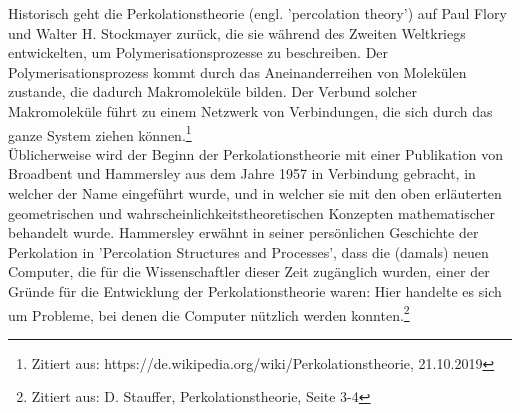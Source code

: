 \documentclass[a4paper, 12pt]{scrartcl}
\begin{document}
\noindent Historisch geht die Perkolationstheorie (engl. 'percolation theory') auf Paul Flory und Walter H. Stockmayer zurück, die sie während des Zweiten Weltkriegs entwickelten, um Polymerisationsprozesse zu beschreiben. Der Polymerisationsprozess kommt durch das Aneinanderreihen von Molekülen zustande, die dadurch Makromoleküle bilden. Der Verbund solcher Makromoleküle führt zu einem Netzwerk von Verbindungen, die sich durch das ganze System ziehen können.\footnote{Zitiert aus: https://de.wikipedia.org/wiki/Perkolationstheorie, 21.10.2019}
\\
\noindent Üblicherweise wird der Beginn der Perkolationstheorie mit einer Publikation von Broadbent  und Hammersley aus dem Jahre 1957 in Verbindung gebracht, in welcher der Name eingeführt wurde, und in welcher sie mit den oben erläuterten geometrischen und wahrscheinlichkeitstheoretischen Konzepten mathematischer behandelt wurde. Hammersley erwähnt in seiner persönlichen Geschichte der Perkolation in 'Percolation Structures and Processes', dass die (damals) neuen Computer, die für die Wissenschaftler dieser Zeit zugänglich wurden, einer der Gründe für die Entwicklung der Perkolationstheorie waren: Hier handelte es sich um Probleme, bei denen die Computer nützlich werden konnten.\footnote{Zitiert aus: D. Stauffer, Perkolationstheorie, Seite 3-4}
\end{document}
